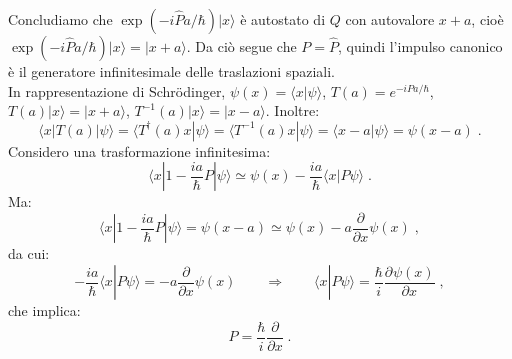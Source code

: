 \documentclass[12pt,a4paper]{report}
\theoremstyle{definition}
\newcommand{\pdev}[3][]{\frac{\partial^{#1} #2}{\partial #3^{#1}}}
\numberwithin{equation}{section}
\newcommand{\bra}{\langle}
\newcommand{\ket}{\rangle}
\newcommand{\Sch}{Schrödinger}
\newcommand{\adj}[1]{#1^{\dagger}}
\begin{document}
Concludiamo che $\exp(-i\hat{P}a/\hbar)|x\ket$ è autostato di $Q$ con autovalore $x+a$, cioè $\exp(-i\hat{P}a/\hbar)|x\ket=|x+a\ket$. Da ciò segue che $P=\hat{P}$, quindi l'impulso canonico è il generatore infinitesimale delle traslazioni spaziali. \\
In rappresentazione di \Sch, $\psi(x)=\bra x|\psi\ket$, $T(a)=e^{-iPa/\hbar}$, $T(a)|x\ket=|x+a\ket$, $T^{-1}(a)|x\ket=|x-a\ket$. Inoltre:
$$
\bra x|T(a)|\psi\ket=\bra \adj{T}(a)x|\psi\ket=\bra T^{-1}(a)x|\psi\ket=\bra x-a|\psi\ket=\psi(x-a)\;.
$$
Considero una trasformazione infinitesima:
\begin{equation}
\bra x|1-\frac{ia}{\hbar}P|\psi\ket\simeq \psi(x)-\frac{ia}{\hbar}\bra x|P\psi\ket\;.
\end{equation}
Ma:
\begin{equation}
\bra x|1-\frac{ia}{\hbar}P|\psi\ket=\psi(x-a)\simeq \psi(x)-a\frac{\partial}{\partial x}\psi(x)\;,
\end{equation}
da cui:
\begin{equation}
-\frac{ia}{\hbar}\bra x|P\psi\ket=-a\frac{\partial}{\partial x}\psi(x) \qquad \Longrightarrow \qquad \bra x|P\psi\ket=\frac{\hbar}{i}\pdev{\psi(x)}{x}\;,
\end{equation}
che implica:
\begin{equation}
P=\frac{\hbar}{i}\frac{\partial}{\partial x}\;.
\end{equation}
\end{document}
